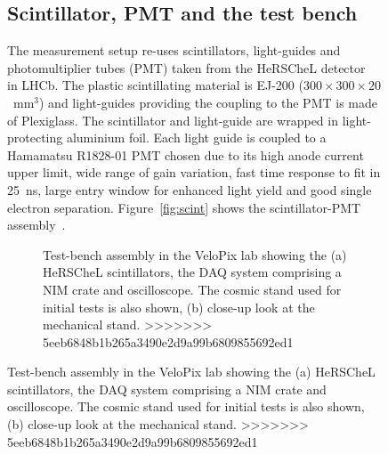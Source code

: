 \begin{figure}
{\subsection{Scintillator, PMT and the test bench}
The measurement setup re-uses scintillators, light-guides and photomultiplier tubes (PMT) taken from the HeRSCheL detector~\cite{LHCb-DP-2016-003} in LHCb. The plastic scintillating material is EJ-200 ($300\times300\times20$~mm$^3$) and light-guides providing the coupling to the PMT is made of Plexiglass. The scintillator and light-guide are wrapped in light-protecting aluminium foil. Each light guide is coupled to a Hamamatsu R1828-01 PMT chosen due to its high anode current upper limit, wide range of gain variation, fast time response to fit in 25~ns, large entry window for enhanced light yield and good single electron separation. Figure~\ref{fig:scint} shows the scintillator-PMT assembly~\cite{LHCb-DP-2016-003}.


\begin{figure}
\centering
{}
\caption{\label{fig:test_bench} Test-bench assembly in the VeloPix lab showing the (a) HeRSCheL scintillators, the DAQ system comprising a NIM crate and oscilloscope. The cosmic stand used for initial tests is also shown, (b) close-up look at the mechanical stand.
>>>>>>> 5eeb6848b1b265a3490e2d9a99b6809855692ed1
}
\end{figure}

}
\end{figure}
